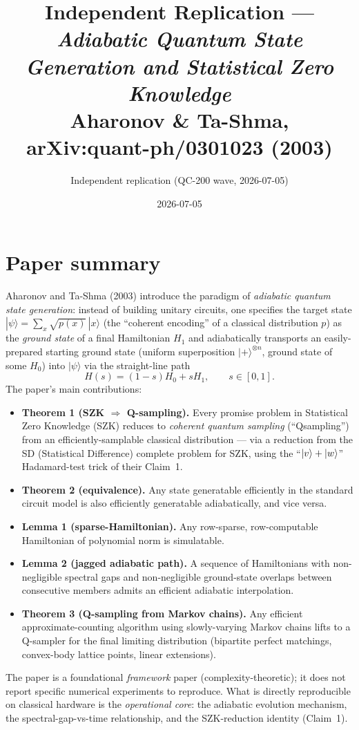 \documentclass[11pt]{article}
\title{Independent Replication --- \emph{Adiabatic Quantum State Generation and Statistical Zero Knowledge}\\
\large Aharonov \& Ta-Shma, arXiv:quant-ph/0301023 (2003)}
\author{Independent replication (QC-200 wave, 2026-07-05)}
\date{2026-07-05}
\begin{document}
\maketitle

\section{Paper summary}

Aharonov and Ta-Shma (2003) introduce the paradigm of \emph{adiabatic quantum state
generation}: instead of building unitary circuits, one specifies the target state
$|\psi\rangle = \sum_x \sqrt{p(x)}\,|x\rangle$ (the ``coherent encoding'' of a classical
distribution $p$) as the \emph{ground state} of a final Hamiltonian $H_1$ and
adiabatically transports an easily-prepared starting ground state
(uniform superposition $|+\rangle^{\otimes n}$, ground state of some $H_0$) into
$|\psi\rangle$ via the straight-line path
\[
H(s) = (1-s)H_0 + s H_1, \qquad s \in [0,1].
\]
The paper's main contributions:
\begin{itemize}
\item \textbf{Theorem 1 (SZK $\Rightarrow$ Q-sampling).} Every promise problem in
Statistical Zero Knowledge (SZK) reduces to \emph{coherent quantum sampling}
(``Qsampling'') from an efficiently-samplable classical distribution --- via a
reduction from the SD (Statistical Difference) complete problem for SZK, using
the ``$\ket{v}+\ket{w}$'' Hadamard-test trick of their Claim~1.
\item \textbf{Theorem 2 (equivalence).} Any state generatable efficiently in the
standard circuit model is also efficiently generatable adiabatically, and vice
versa.
\item \textbf{Lemma 1 (sparse-Hamiltonian).} Any row-sparse, row-computable
Hamiltonian of polynomial norm is simulatable.
\item \textbf{Lemma 2 (jagged adiabatic path).} A sequence of Hamiltonians with
non-negligible spectral gaps and non-negligible ground-state overlaps between
consecutive members admits an efficient adiabatic interpolation.
\item \textbf{Theorem 3 (Q-sampling from Markov chains).} Any efficient
approximate-counting algorithm using slowly-varying Markov chains lifts to a
Q-sampler for the final limiting distribution (bipartite perfect matchings,
convex-body lattice points, linear extensions).
\end{itemize}
The paper is a foundational \emph{framework} paper (complexity-theoretic); it
does not report specific numerical experiments to reproduce. What is directly
reproducible on classical hardware is the \emph{operational core}: the adiabatic
evolution mechanism, the spectral-gap-vs-time relationship, and the
SZK-reduction identity (Claim~1).
\end{document}
